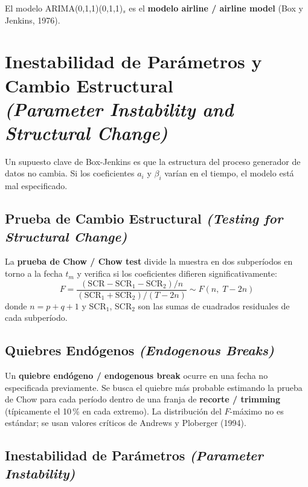 \documentclass[12pt]{article}
\begin{document}
El modelo ARIMA(0,1,1)(0,1,1)$_s$ es el \textbf{modelo airline / airline model} (Box y Jenkins, 1976).

\section{Inestabilidad de Par\'ametros y Cambio Estructural\\
\textit{(Parameter Instability and Structural Change)}}

Un supuesto clave de Box-Jenkins es que la estructura del proceso generador de datos no cambia. Si los coeficientes $a_i$ y $\beta_i$ var\'ian en el tiempo, el modelo est\'a mal especificado.

\subsection{Prueba de Cambio Estructural \textit{(Testing for Structural Change)}}

La \textbf{prueba de Chow / Chow test} divide la muestra en dos subper\'iodos en torno a la fecha $t_m$ y verifica si los coeficientes difieren significativamente:
\begin{equation}
F = \frac{(\text{SCR} - \text{SCR}_1 - \text{SCR}_2)/n}{(\text{SCR}_1 + \text{SCR}_2)/(T-2n)}
  \sim F(n,\;T-2n)
\end{equation}
donde $n = p + q + 1$ y SCR$_1$, SCR$_2$ son las sumas de cuadrados residuales de cada subper\'iodo.

\subsection{Quiebres End\'ogenos \textit{(Endogenous Breaks)}}

Un \textbf{quiebre end\'ogeno / endogenous break} ocurre en una fecha no especificada previamente. Se busca el quiebre m\'as probable estimando la prueba de Chow para cada per\'iodo dentro de una franja de \textbf{recorte / trimming} (t\'ipicamente el 10\,\% en cada extremo). La distribuci\'on del $F$-m\'aximo no es est\'andar; se usan valores cr\'iticos de Andrews y Ploberger (1994).

\subsection{Inestabilidad de Par\'ametros \textit{(Parameter Instability)}}
\end{document}
